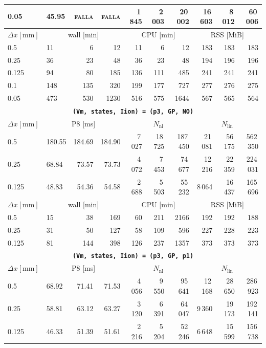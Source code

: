 \documentclass[11pt,a4paper]{article}
\newcommand{\code}[1]{\texttt{\small #1}}
\begin{document}
\begin{center}
\begin{longtable}{l|lrr|rrr|rrr}
0.05 & 45.95 & \textsc{falla} & \textsc{falla} & 1\,845 & 2\,003 & 20\,002 & 16\,603 & 8\,012 & 60\,006\\
\hline
$ \Delta x [\text{mm}] $ & \multicolumn{3}{c|}{wall [min]} & \multicolumn{3}{c|}{CPU [min]} & \multicolumn{3}{c|}{RSS [MiB]}\\
0.5 & 11 & 6 & 12 & 11 & 6 & 12 & 183 & 183 & 183\\
0.25 & 36 & 23 & 48 & 36 & 23 & 48 & 194 & 196 & 196\\
0.125 & 94 & 80 & 185 & 136 & 111 & 485 & 241 & 241 & 241\\
0.1 & 148 & 135 & 320 & 199 & 177 & 727 & 277 & 276 & 275\\
0.05 & 473 & 530 & 1230 & 516 & 575 & 1644 & 567 & 565 & 564\\
\hline
\hline
\multicolumn{10}{c}{\textbf{\code{(Vm, states, Iion) = (p3, GP, NO)}}}\\\hline
$ \Delta x [\text{mm}] $ & \multicolumn{3}{c|}{P8 [ms]} & \multicolumn{3}{c|}{$N_{\mathrm{nl}}$} & \multicolumn{3}{c|}{$N_{\mathrm{lin}}$}\\
0.5 & 180.55 & 184.69 & 184.90 & 7\,027 & 18\,725 & 187\,450 & 21\,081 & 56\,175 & 562\,350\\
0.25 & 68.84 & 73.57 & 73.73 & 4\,072 & 7\,453 & 74\,677 & 12\,216 & 22\,359 & 224\,031\\
0.125 & 48.83 & 54.36 & 54.58 & 2\,688 & 5\,503 & 55\,232 & 8\,064 & 16\,437 & 165\,696\\
\hline
$ \Delta x [\text{mm}] $ & \multicolumn{3}{c|}{wall [min]} & \multicolumn{3}{c|}{CPU [min]} & \multicolumn{3}{c|}{RSS [MiB]}\\
0.5 & 15 & 38 & 169 & 60 & 211 & 2166 & 192 & 192 & 188\\
0.25 & 31 & 50 & 127 & 58 & 109 & 596 & 227 & 228 & 223\\
0.125 & 81 & 144 & 398 & 126 & 237 & 1357 & 373 & 373 & 373\\
\hline
\hline
\multicolumn{10}{c}{\textbf{\code{(Vm, states, Iion) = (p3, GP, p1)}}}\\\hline
$ \Delta x [\text{mm}] $ & \multicolumn{3}{c|}{P8 [ms]} & \multicolumn{3}{c|}{$N_{\mathrm{nl}}$} & \multicolumn{3}{c|}{$N_{\mathrm{lin}}$}\\
0.5 & 68.92 & 71.41 & 71.53 & 4\,056 & 9\,550 & 95\,641 & 12\,168 & 28\,650 & 286\,923\\
0.25 & 58.81 & 63.12 & 63.27 & 3\,120 & 6\,391 & 64\,047 & 9\,360 & 19\,173 & 192\,141\\
0.125 & 46.33 & 51.39 & 51.61 & 2\,216 & 5\,204 & 52\,246 & 6\,648 & 15\,599 & 156\,738\\

\end{longtable}
\end{center}
\end{document}
